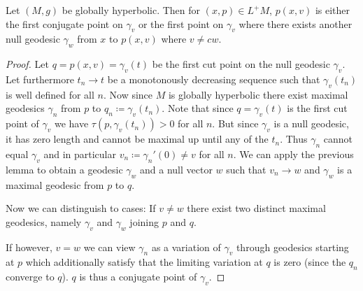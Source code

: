 \begin{theorem}
Let $(M,g)$ be globally hyperbolic.
Then for $(x,p)\in L^+M$, $p(x,v)$ is either the first conjugate point on $\gamma_v$ or the first point on $\gamma_v$ where there exists another null geodesic $\gamma_w$ from $x$ to $p(x,v)$ where $v \neq cw$.
\end{theorem}
\begin{proof}
Let $q=p(x,v)=\gamma_v(t)$ be the first cut point on the null geodesic $\gamma_v$. Let furthermore $t_n\to t$ be a monotonously decreasing sequence such that $\gamma_v(t_n)$ is well defined for all $n$. Now since $M$ is globally hyperbolic there exist maximal geodesics $\gamma_n$ from $p$ to $q_n\coloneqq\gamma_v(t_n)$. Note that since $q=\gamma_v(t)$ is the first cut point of $\gamma_v$ we have $\tau(p,\gamma_v(t_n))>0$ for all $n$. But since $\gamma_v$ is a null geodesic, it has zero length and cannot be maximal up until any of the $t_n$. Thus $\gamma_n$ cannot equal $\gamma_v$ and in particular $v_n\coloneqq\gamma_n'(0)\neq v$ for all $n$. We can apply the previous lemma to obtain a geodesic $\gamma_w$ and a null vector $w$ such that $v_n\to w$ and $\gamma_w$ is a maximal geodesic from $p$ to $q$. 

Now we can distinguish to cases:
If $v\neq w$ there exist two distinct maximal geodesics, namely $\gamma_v$ and $\gamma_w$ joining $p$ and $q$.

If however, $v=w$ we can view $\gamma_n$ as a variation of $\gamma_v$ through geodesics starting at $p$ which additionally satisfy that the limiting variation at $q$ is zero (since the $q_n$ converge to $q$). $q$ is thus a conjugate point of $\gamma_v$.
\end{proof}

